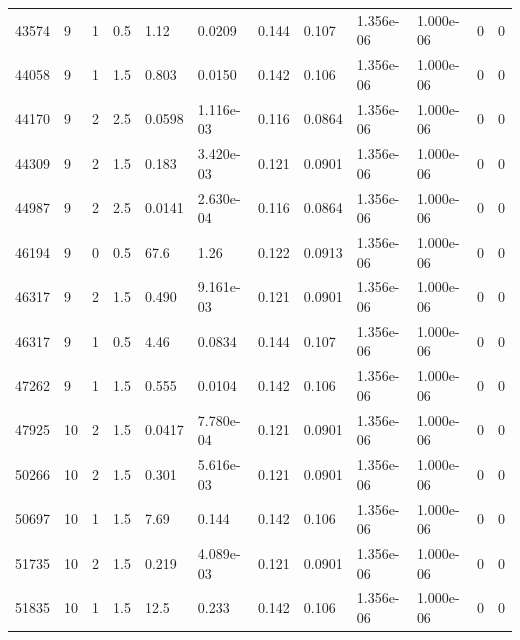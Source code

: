 \documentclass[preview]{standalone}
\begin{document}
{{{\begin{tabular}{L{1.2cm}C{1.2cm} C{0.3cm}C{0.5cm} C{1.4cm}C{1.4cm} C{1.4cm}C{1.4cm} C{1.6cm}C{1.6cm} C{1.6cm}C{1.6cm}}
  43574  &     9  & 1     & 0.5 &  1.12  & 0.0209  &  0.144&   0.107& 1.356e-06 & 1.000e-06   &  0 & 0  \\ 
  44058  &     9  & 1     & 1.5 &  0.803  & 0.0150  &  0.142&   0.106& 1.356e-06 & 1.000e-06   &  0 & 0  \\ 
  44170  &     9  & 2     & 2.5 &  0.0598  & 1.116e-03  &  0.116&   0.0864& 1.356e-06 & 1.000e-06   &  0 & 0  \\ 
  44309  &     9  & 2     & 1.5 &  0.183  & 3.420e-03  &  0.121&   0.0901& 1.356e-06 & 1.000e-06   &  0 & 0  \\ 
  44987  &     9  & 2     & 2.5 &  0.0141  & 2.630e-04  &  0.116&   0.0864& 1.356e-06 & 1.000e-06   &  0 & 0  \\ 
  46194  &     9  & 0     & 0.5 &  67.6  & 1.26  &  0.122&   0.0913& 1.356e-06 & 1.000e-06   &  0 & 0  \\ 
  46317  &     9  & 2     & 1.5 &  0.490  & 9.161e-03  &  0.121&   0.0901& 1.356e-06 & 1.000e-06   &  0 & 0  \\ 
  46317  &     9  & 1     & 0.5 &  4.46  & 0.0834  &  0.144&   0.107& 1.356e-06 & 1.000e-06   &  0 & 0  \\ 
  47262  &     9  & 1     & 1.5 &  0.555  & 0.0104  &  0.142&   0.106& 1.356e-06 & 1.000e-06   &  0 & 0  \\ 
  47925  &    10  & 2     & 1.5 &  0.0417  & 7.780e-04  &  0.121&   0.0901& 1.356e-06 & 1.000e-06   &  0 & 0  \\ 
  50266  &    10  & 2     & 1.5 &  0.301  & 5.616e-03  &  0.121&   0.0901& 1.356e-06 & 1.000e-06   &  0 & 0  \\ 
  50697  &    10  & 1     & 1.5 &  7.69  & 0.144  &  0.142&   0.106& 1.356e-06 & 1.000e-06   &  0 & 0  \\ 
  51735  &    10  & 2     & 1.5 &  0.219  & 4.089e-03  &  0.121&   0.0901& 1.356e-06 & 1.000e-06   &  0 & 0  \\ 
  51835  &    10  & 1     & 1.5 &  12.5  & 0.233  &  0.142&   0.106& 1.356e-06 & 1.000e-06   &  0 & 0  \\ 
\hline 
\end{tabular} 

}}}
\end{document}

